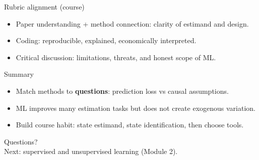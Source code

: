 \documentclass[aspectratio=169,11pt]{beamer}
\begin{document}
\begin{frame}{Rubric alignment (course)}
  \begin{itemize}
    \item Paper understanding + method connection: clarity of estimand and design.
    \item Coding: reproducible, explained, economically interpreted.
    \item Critical discussion: limitations, threats, and honest scope of ML.
  \end{itemize}
\end{frame}

\begin{frame}{Summary}
  \begin{itemize}
    \item Match methods to \textbf{questions}: prediction loss vs causal assumptions.
    \item ML improves many estimation tasks but does not create exogenous variation.
    \item Build course habit: state estimand, state identification, then choose tools.
  \end{itemize}
\end{frame}

\begin{frame}[plain]
  \begin{center}
    \Large Questions?\\[1em]
    \normalsize Next: supervised and unsupervised learning (Module 2).
  \end{center}
\end{frame}
\end{document}
